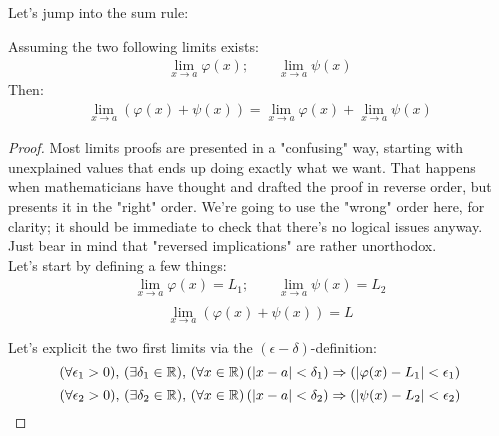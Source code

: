 \documentclass[solutions.tex]{subfiles}
\begin{document}
Let's jump into the sum rule:
\begin{theorem} Assuming the two following limits
exists:
\begin{equation*} \begin{aligned}
	\lim_{x \rightarrow a}\varphi(x);\qquad\lim_{x \rightarrow a}\psi(x)
\end{aligned} \end{equation*}
Then:
\begin{equation*} \begin{aligned}
	\boxed{\lim_{x \rightarrow a}\left(\varphi(x)+\psi(x)\right) =
		\lim_{x \rightarrow a}\varphi(x)
		+ \lim_{x \rightarrow a}\psi(x)}
\end{aligned} \end{equation*}
\end{theorem}
\begin{proof} Most limits proofs are presented in a "confusing"
way, starting with unexplained values that ends up doing exactly
what we want. That happens when mathematicians have thought and
drafted the proof in reverse order, but presents it in the
"right" order. We're going to use the "wrong" order here, for
clarity; it should be immediate to check that there's no logical
issues anyway. Just bear in mind that "reversed implications" are
rather unorthodox. \\

Let's start by defining a few things:
\begin{equation*} \begin{aligned}
	\lim_{x \rightarrow a}\varphi(x) = L_1;\qquad\lim_{x \rightarrow a}\psi(x) = L_2 \\
\end{aligned} \end{equation*}
\[	\lim_{x \rightarrow a}\left(\varphi(x)+\psi(x)\right) = L \]

Let's explicit the two first limits via the $(\epsilon-\delta)$-definition:
\[ \epsdelta{\epsilon_1}{\delta_1}{a}{x}{\varphi(x)}{L_1}  \]
\[ \epsdelta{\epsilon_2}{\delta_2}{a}{x}{\psi(x)}{L_2}     \]


\end{proof}
\end{document}
